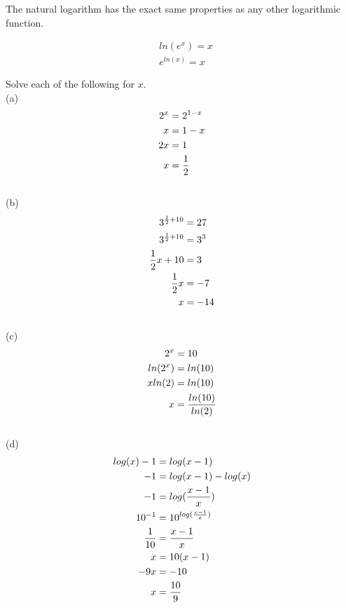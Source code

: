 The natural logarithm has the exact same properties as any other logarithmic function. \\

\begin{theorem}
	\begin{align}
		 & ln(e^x) = x   \\
		 & e^{ln(x)} = x
	\end{align}
\end{theorem}

\begin{exercise}\nonumber
	Solve each of the following for $ x $. \\

	(a)
	\begin{align}
		2^x & = 2^{1-x}     \\
		x   & = 1 - x       \\
		2x  & = 1           \\
		x   & = {1 \over 2}
	\end{align}
	\\

	(b)
	\begin{align}
		3^{{1 \over 2} + 10} & = 27   \\
		3^{{1 \over 2} + 10} & = 3^3  \\
		{1 \over 2}x + 10    & = 3    \\
		{1 \over 2}x         & = -7   \\
		x                    & = - 14
	\end{align}
	\\

	(c)
	\begin{align}
		2^x     & = 10                   \\
		ln(2^x) & = ln(10)               \\
		xln(2)  & = ln(10)               \\
		x       & = {ln(10) \over ln(2)}
	\end{align}
	\\

	(d)
	\begin{align}
		log(x) - 1   & = log(x - 1)                \\
		-1           & = log(x - 1) - log(x)       \\
		-1           & = log({x - 1 \over x})      \\
		10^{-1}      & = 10^{log({x - 1 \over x})} \\
		{1 \over 10} & = {x - 1 \over x}           \\
		x            & = 10(x - 1)                 \\
		-9x          & = -10                       \\
		x            & = {10 \over 9}
	\end{align}
	\\


\end{exercise}
